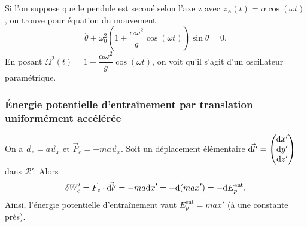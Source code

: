             Si l'on suppose que le pendule est secoué selon l'axe z avec $z_{A}(t)=\alpha\cos(\omega t)$, on trouve pour équation du mouvement
            \begin{equation}
                \ddot{\theta}+\omega_{0}^{2}\left(1+\frac{\alpha\omega^{2}}{g}\cos(\omega t)\right)\sin\theta = 0.
            \end{equation}
            En posant $\Omega^{2}(t)=1+\dfrac{\alpha\omega^{2}}{g}\cos(\omega t)$, on voit qu'il s'agit d'un oscillateur paramétrique.

        \subsubsection{Énergie potentielle d'entraînement par translation uniformément accélérée}
            
            On a $\vec{a}_e=a\vec{u}_x$ et $\vec{F}_e=-ma\vec{u}_x$. Soit un déplacement élémentaire $\vec{\mathrm{d} l'}=\begin{pmatrix}\mathrm{d} x'\\\mathrm{d} y'\\\mathrm{d} z'\end{pmatrix} $ dans $\mathcal{R}'$. Alors 
            \begin{equation}
                \delta W_e'=\vec{F}_e\cdot\vec{\mathrm{d} l'}=-ma\mathrm{d} x'=-\mathrm{d}(max')=-\mathrm{d} E_p^{\text{ent}}.
            \end{equation}
            Ainsi, l'énergie potentielle d'entraînement vaut $E_{p}^{\text{ent}}=max'$ (à une constante près).

